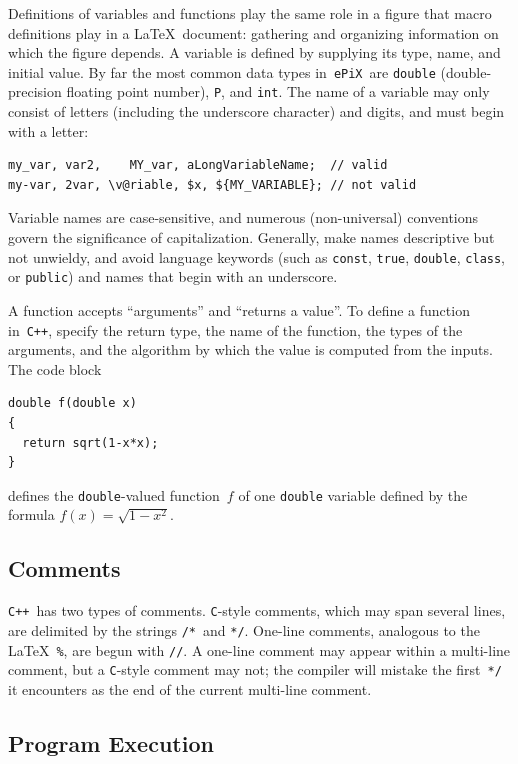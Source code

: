 \documentclass[12pt,letterpaper]{book}
\newcommand{\code}[1]{\texttt{#1}}
\newcommand{\ePiX}{\code{ePiX}}
\newcommand{\CXX}{\code{C++}}
\newcommand{\teximath}[1]{$#1$}
\begin{document}
Definitions of variables and functions play the same role in a figure
that macro definitions play in a \LaTeX\ document: gathering and
organizing information on which the figure depends. A variable is
defined by supplying its type, name, and initial value. By far the
most common data types in~\ePiX\ are \code{double} (double-precision
floating point number), \code{P}, and \code{int}. The name of a
variable may only consist of letters (including the underscore
character) and digits, and must begin with a letter:
\begin{verbatim}
my_var, var2,    MY_var, aLongVariableName;  // valid
my-var, 2var, \v@riable, $x, ${MY_VARIABLE}; // not valid
\end{verbatim}
Variable names are case-sensitive, and numerous (non-universal)
conventions govern the significance of capitalization. Generally, make
names descriptive but not unwieldy, and avoid language keywords (such
as \code{const}, \code{true}, \code{double}, \code{class}, or
\code{public}) and names that begin with an underscore.

A function accepts ``arguments'' and ``returns a value''. To define a
function in~\CXX, specify the return type, the name of the function,
the types of the arguments, and the algorithm by which the value is
computed from the inputs.  The code block
\begin{verbatim}
double f(double x) 
{ 
  return sqrt(1-x*x); 
}
\end{verbatim}
defines the \code{double}-valued function~\teximath{f} of one \code{double}
variable defined by the formula \teximath{f(x)=\sqrt{1-x^2}}.


\subsection{Comments}

\CXX\ has two types of comments. \code{C}-style comments, which may
span several lines, are delimited by the strings \code{/*}~and
\code{*/}. One-line comments, analogous to the \LaTeX~\code{\%}, are
begun with \code{//}. A one-line comment may appear within a multi-line
comment, but a \code{C}-style comment may not; the compiler will
mistake the first~\code{*/} it encounters as the end of the current
multi-line comment.


\subsection{Program Execution}
\end{document}
